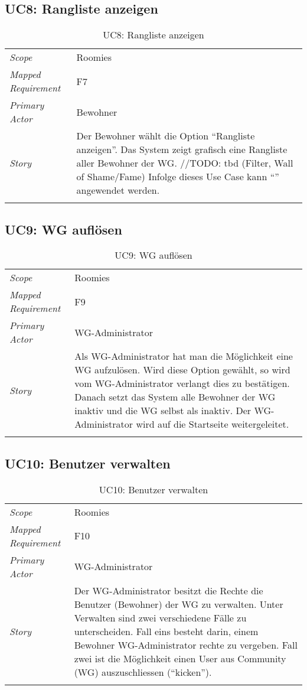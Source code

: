 \subsection{UC8: Rangliste anzeigen}\label{subsec:uc8}
\begin{table}[H]
	\tablestyle
	\tablealtcolored
	\begin{tabularx}{\textwidth}{lX}
		\tablebody
			\textit{Scope} &
			Roomies
			\tabularnewline
			\textit{Mapped Requirement} &
			F7
			\tabularnewline
			\textit{Primary Actor} &
			Bewohner
			\tabularnewline
			\textit{Story} &
			Der Bewohner wählt die Option ``Rangliste anzeigen''. Das System zeigt grafisch eine Rangliste aller Bewohner der WG.
			\newline //TODO: tbd (Filter, Wall of Shame/Fame)
			\newline Infolge dieses Use Case kann ``\nameref{subsec:uc11}'' angewendet werden.
			\tabularnewline
		\tableend
	\end{tabularx}
	\caption{UC8: Rangliste anzeigen}
\end{table}


\subsection{UC9: WG auflösen}\label{subsec:uc9}
\begin{table}[H]
	\tablestyle
	\tablealtcolored
	\begin{tabularx}{\textwidth}{lX}
		\tablebody
			\textit{Scope} &
			Roomies
			\tabularnewline
			\textit{Mapped Requirement} &
			F9
			\tabularnewline
			\textit{Primary Actor} &
			WG-Administrator
			\tabularnewline
			\textit{Story} &
			Als WG-Administrator hat man die Möglichkeit eine WG aufzulösen. Wird diese Option gewählt, so wird vom WG-Administrator verlangt dies zu bestätigen. Danach setzt das System alle Bewohner der WG inaktiv und die WG selbst als inaktiv. Der WG-Administrator wird auf die Startseite weitergeleitet.
			\tabularnewline
		\tableend
	\end{tabularx}
	\caption{UC9: WG auflösen}
\end{table}


\subsection{UC10: Benutzer verwalten}\label{subsec:uc10}
\begin{table}[H]
	\tablestyle
	\tablealtcolored
	\begin{tabularx}{\textwidth}{lX}
		\tablebody
			\textit{Scope} &
			Roomies
			\tabularnewline
			\textit{Mapped Requirement} &
			F10
			\tabularnewline
			\textit{Primary Actor} &
			WG-Administrator
			\tabularnewline
			\textit{Story} &
			Der WG-Administrator besitzt die Rechte die Benutzer (Bewohner) der WG zu verwalten. Unter Verwalten sind zwei verschiedene Fälle zu unterscheiden. Fall eins besteht darin, einem Bewohner WG-Administrator rechte zu vergeben. Fall zwei ist die Möglichkeit einen User aus Community (WG) auszuschliessen (``kicken'').
			\tabularnewline
		\tableend
	\end{tabularx}
	\caption{UC10: Benutzer verwalten}
\end{table}


